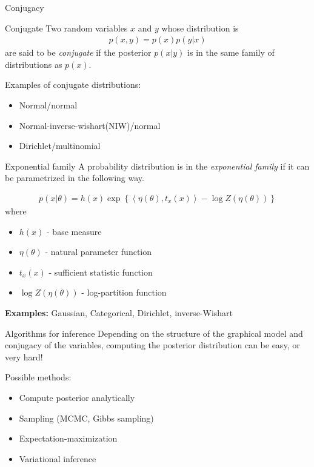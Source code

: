 \documentclass[10pt, compress]{beamer}
\begin{document}
\begin{frame}{Conjugacy}
  \begin{block}{Conjugate}
    Two random variables $x$ and $y$ whose distribution is
    \begin{align*}p(x, y) = p(x)p(y | x)\end{align*} are said to be
      \emph{conjugate} if the posterior $p(x | y)$
    is in the same family of distributions as $p(x)$.
  \end{block}
  \pause
  Examples of conjugate distributions:
  \begin{itemize}
    \item Normal/normal
      \pause
    \item Normal-inverse-wishart(NIW)/normal
      \pause
    \item Dirichlet/multinomial
  \end{itemize}
\end{frame}

\begin{frame}{Exponential family}
  A probability distribution is in the \emph{exponential family}
  if it can be parametrized in the following way.

  \pause

  \begin{align*}
    p(x | \theta) = h(x)\exp\left\{\left\langle\eta(\theta), t_x(x)\right\rangle - \log Z(\eta(\theta))\right\}
  \end{align*}
  where
  \begin{itemize}
      \pause
    \item $h(x)$ - base measure
      \pause
    \item $\eta(\theta)$ - natural parameter function
      \pause
    \item $t_x(x)$ - sufficient statistic function
      \pause
    \item $\log Z(\eta(\theta))$ - log-partition function
  \end{itemize}
  \pause
  \textbf{Examples:} Gaussian, Categorical, Dirichlet, inverse-Wishart
\end{frame}

\begin{frame}{Algorithms for inference}
  Depending on the structure of the graphical model
  and conjugacy of the variables, computing the posterior distribution
  can be easy, or very hard!

  \pause
  Possible methods:
  \begin{itemize}
    \item<2-> Compute posterior analytically
      \pause
    \item<3-> Sampling (MCMC, Gibbs sampling)
      \pause
    \item<4-> Expectation-maximization
      \pause
    \item<5->\alert<6->{Variational inference}
  \end{itemize}
  \pause
\end{frame}
\end{document}
